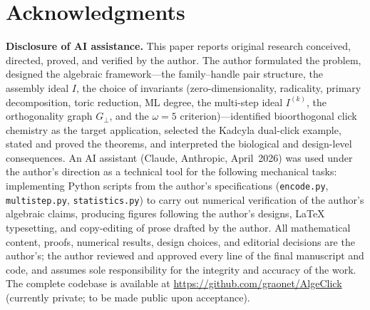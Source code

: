 \documentclass[preprint,12pt]{elsarticle}
\theoremstyle{definition}
\theoremstyle{remark}
\begin{document}
\section*{Acknowledgments}
\textbf{Disclosure of AI assistance.}
This paper reports original research conceived, directed,
proved, and verified by the author.  The author formulated
the problem, designed the algebraic framework---the
family--handle pair structure, the assembly ideal $I$, the
choice of invariants (zero-dimensionality, radicality,
primary decomposition, toric reduction, ML degree, the
multi-step ideal $I^{(k)}$, the orthogonality graph
$G_\perp$, and the $\omega = 5$ criterion)---identified
bioorthogonal click chemistry as the target application,
selected the Kadcyla dual-click example, stated and proved
the theorems, and interpreted the biological and design-level
consequences.  An AI assistant (Claude, Anthropic, April~2026)
was used under the author's direction as a technical tool
for the following mechanical tasks: implementing Python
scripts from the author's specifications
(\texttt{encode.py}, \texttt{multistep.py},
\texttt{statistics.py}) to carry out numerical verification
of the author's algebraic claims, producing figures
following the author's designs, \LaTeX{} typesetting, and
copy-editing of prose drafted by the author.  All
mathematical content, proofs, numerical results, design
choices, and editorial decisions are the author's; the
author reviewed and approved every line of the final
manuscript and code, and assumes sole responsibility for
the integrity and accuracy of the work.  The complete
codebase is available at
\url{https://github.com/graonet/AlgeClick} (currently
private; to be made public upon acceptance).
\end{document}

